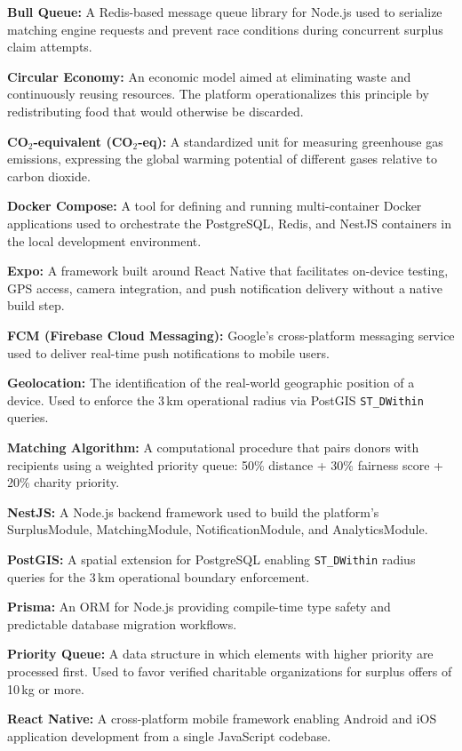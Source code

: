 \documentclass[conference]{IEEEtran}
\begin{document}
\textbf{Bull Queue:} A Redis-based message queue library for Node.js used to serialize matching engine requests and prevent race conditions during concurrent surplus claim attempts.

\textbf{Circular Economy:} An economic model aimed at eliminating waste and continuously reusing resources. The platform operationalizes this principle by redistributing food that would otherwise be discarded.

\textbf{CO$_2$-equivalent (CO$_2$-eq):} A standardized unit for measuring greenhouse gas emissions, expressing the global warming potential of different gases relative to carbon dioxide.

\textbf{Docker Compose:} A tool for defining and running multi-container Docker applications used to orchestrate the PostgreSQL, Redis, and NestJS containers in the local development environment.

\textbf{Expo:} A framework built around React Native that facilitates on-device testing, GPS access, camera integration, and push notification delivery without a native build step.

\textbf{FCM (Firebase Cloud Messaging):} Google's cross-platform messaging service used to deliver real-time push notifications to mobile users.

\textbf{Geolocation:} The identification of the real-world geographic position of a device. Used to enforce the 3\,km operational radius via PostGIS \texttt{ST\_DWithin} queries.

\textbf{Matching Algorithm:} A computational procedure that pairs donors with recipients using a weighted priority queue: 50\% distance + 30\% fairness score + 20\% charity priority.

\textbf{NestJS:} A Node.js backend framework used to build the platform's SurplusModule, MatchingModule, NotificationModule, and AnalyticsModule.

\textbf{PostGIS:} A spatial extension for PostgreSQL enabling \texttt{ST\_DWithin} radius queries for the 3\,km operational boundary enforcement.

\textbf{Prisma:} An ORM for Node.js providing compile-time type safety and predictable database migration workflows.

\textbf{Priority Queue:} A data structure in which elements with higher priority are processed first. Used to favor verified charitable organizations for surplus offers of 10\,kg or more.

\textbf{React Native:} A cross-platform mobile framework enabling Android and iOS application development from a single JavaScript codebase.
\end{document}
